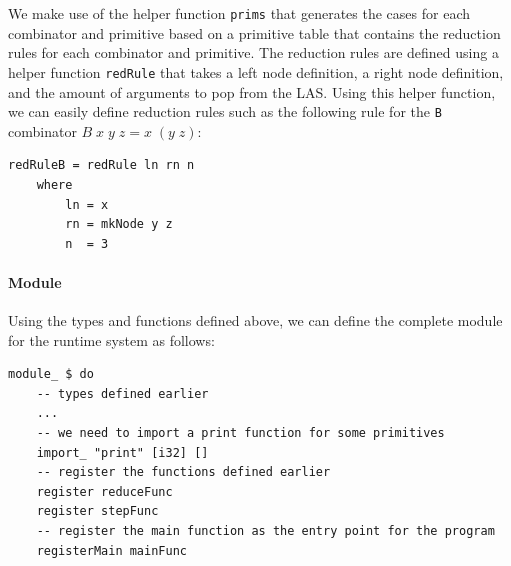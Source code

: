 We make use of the helper function \texttt{prims} that generates the cases for each combinator and primitive based on a primitive table that contains the reduction rules for each combinator and primitive. The reduction rules are defined using a helper function \texttt{redRule} that takes a left node definition, a right node definition, and the amount of arguments to pop from the LAS. Using this helper function, we can easily define reduction rules such as the following rule for the \verb|B| combinator $B \; x \; y \; z = x \; (y \; z)$:
\begin{verbatim}
redRuleB = redRule ln rn n
    where
        ln = x
        rn = mkNode y z
        n  = 3
\end{verbatim}

\paragraph{Module} Using the types and functions defined above, we can define the complete module for the runtime system as follows:
\begin{verbatim}
module_ $ do
    -- types defined earlier
    ...
    -- we need to import a print function for some primitives
    import_ "print" [i32] []
    -- register the functions defined earlier
    register reduceFunc
    register stepFunc
    -- register the main function as the entry point for the program
    registerMain mainFunc
\end{verbatim}